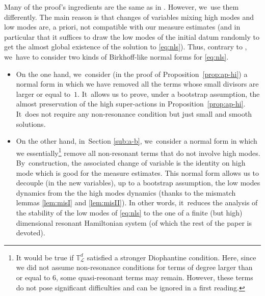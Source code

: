 \documentclass[JEP,XML,SOM,Unicode,published]{cedram}
\theoremstyle{plain}
\theoremstyle{definition}
\newcommand{\1}{\mathbf{1}}
\begin{document}
Many of the proof's ingredients are the same as in \cite{BFM22}. However, we~use them differently. The main reason is that changes of variables mixing high modes and low modes are, a priori, not compatible with our measure estimates (and in particular that it suffices to draw the low modes of the initial datum randomly to get the almost global existence of the solution to \eqref{eq:nls}). Thus, contrary to \cite{BFM22}, we~have to consider two kinds of Birkhoff-like normal forms for \eqref{eq:nls}.
\begin{itemize}
\item On the one hand, we~consider (in the proof of Proposition~\ref{prop:ap-hi}) a normal form in which we have removed all the terms whose small divisors are larger or equal to~$1$. It~allows us to prove, under a bootstrap assumption, the almost preservation of the high super-actions in Proposition~\ref{prop:ap-hi}. It~does not require any non-resonance condition but just small and smooth solutions.

\item On the other hand, in~Section \ref{sub:a-b}, we~consider a normal form in which we essentially\footnote{It would be true if $\mathbb{T}^d_{\mathscr{L}}$ satisfied a stronger Diophantine condition. Here, since we did not assume non-resonance conditions for terms of degree larger than or equal to $6$, some quasi-resonant terms may remain. However, these terms do not pose significant difficulties and can be ignored in a first reading.} remove all non-resonant terms that do not involve high modes. By~construction, the associated change of variable is the identity on high mode which is good for the measure estimates. This normal form allows us to decouple (in the new variables), up to a bootstrap assumption, the low modes dynamics from the the high modes dynamics (thanks to the mismatch lemmas \ref{lem:misI} and \ref{lem:misII}). In other words, it~reduces the analysis of the stability of the low modes of \eqref{eq:nls} to the one of a finite (but high) dimensional resonant Hamiltonian system (of which the rest of the paper is devoted).
\end{itemize}
\end{document}
